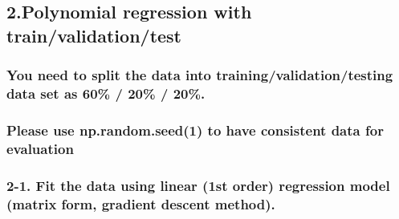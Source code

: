 \documentclass[11pt]{article}
\begin{document}
    \hypertarget{polynomial-regression-with-trainvalidationtest}{%
\subsection{2.Polynomial regression with
train/validation/test}\label{polynomial-regression-with-trainvalidationtest}}

\hypertarget{you-need-to-split-the-data-into-trainingvalidationtesting-data-set-as-60-20-20.}{%
\subsubsection{You need to split the data into
training/validation/testing data set as 60\% / 20\% /
20\%.}\label{you-need-to-split-the-data-into-trainingvalidationtesting-data-set-as-60-20-20.}}

\hypertarget{please-use-np.random.seed1-to-have-consistent-data-for-evaluation}{%
\subsubsection{Please use np.random.seed(1) to have consistent data for
evaluation}\label{please-use-np.random.seed1-to-have-consistent-data-for-evaluation}}

    \hypertarget{fit-the-data-using-linear-1st-order-regression-model-matrix-form-gradient-descent-method.}{%
\subsubsection{2-1. Fit the data using linear (1st order) regression
model (matrix form, gradient descent
method).}\label{fit-the-data-using-linear-1st-order-regression-model-matrix-form-gradient-descent-method.}}
\end{document}
